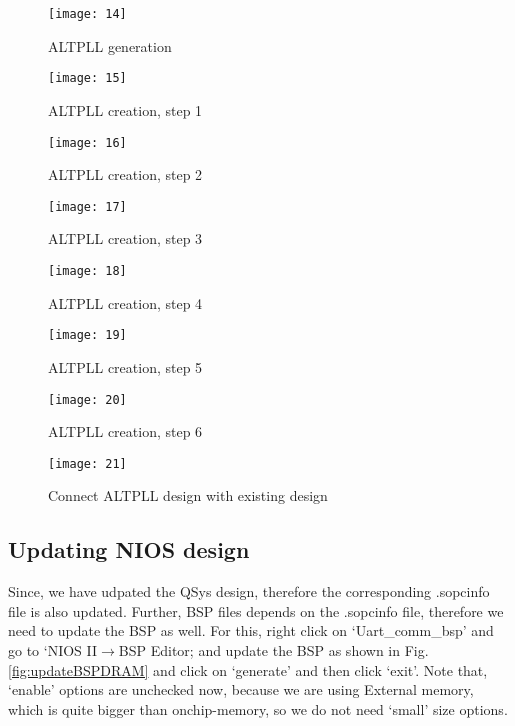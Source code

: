 \begin{figure}[!h]
	\centering
	\texttt{[image: 14]}
	\caption{ALTPLL generation}
	\label{fig:dram_clock_altpll}
\end{figure}

\begin{figure}[!h]
	\centering
	\texttt{[image: 15]}
	\caption{ALTPLL creation, step 1}
	\label{fig:altpllCreation1}
\end{figure}

\begin{figure}[!h]
	\centering
	\texttt{[image: 16]}
	\caption{ALTPLL creation, step 2}
	\label{fig:altpllCreation2}
\end{figure}

\begin{figure}[!h]
	\centering
	\texttt{[image: 17]}
	\caption{ALTPLL creation, step 3}
	\label{fig:altpllCreation3}
\end{figure}

\begin{figure}[!h]
	\centering
	\texttt{[image: 18]}
	\caption{ALTPLL creation, step 4}
	\label{fig:altpllCreation4}
\end{figure}

\begin{figure}[!h]
	\centering
	\texttt{[image: 19]}
	\caption{ALTPLL creation, step 5}
	\label{fig:altpllCreation5}
\end{figure}

\begin{figure}[!h]
	\centering
	\texttt{[image: 20]}
	\caption{ALTPLL creation, step 6}
	\label{fig:altpllCreation6}
\end{figure}

\begin{figure}[!h]
	\centering
	\texttt{[image: 21]}
	\caption{Connect ALTPLL design with existing design}
	\label{fig:altpllCreation7}
\end{figure}

\subsection{Updating NIOS design}
Since, we have udpated the QSys design, therefore the corresponding .sopcinfo file is also updated. Further, BSP files depends on the .sopcinfo file, therefore we need to update the BSP as well. For this, right click on `Uart\_comm\_bsp' and go to `NIOS II$\rightarrow$BSP Editor; and update the BSP as shown in Fig. \ref{fig:updateBSPDRAM} and click on `generate' and then click `exit'. Note that, `enable' options are unchecked now, because we are using External memory, which is quite bigger than onchip-memory, so we do not need `small' size options. 

